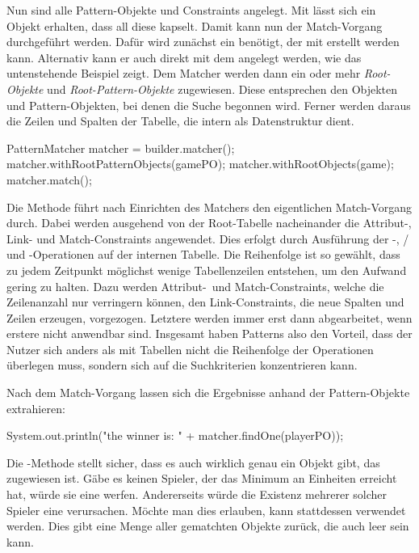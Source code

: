 Nun sind alle Pattern-Objekte und Constraints angelegt.
Mit  lässt sich ein Objekt erhalten, dass all diese kapselt.
Damit kann nun der Match-Vorgang durchgeführt werden.
Dafür wird zunächst ein  benötigt, der mit  erstellt werden kann.
Alternativ kann er auch direkt mit dem  angelegt werden, wie das untenstehende Beispiel zeigt.
Dem Matcher werden dann ein oder mehr \emph{Root-Objekte} und \emph{Root-Pattern-Objekte} zugewiesen.
Diese entsprechen den Objekten und Pattern-Objekten, bei denen die Suche begonnen wird.
Ferner werden daraus die Zeilen und Spalten der Tabelle, die intern als Datenstruktur dient.

\begin{jcodeblock}
    PatternMatcher matcher = builder.matcher();
    matcher.withRootPatternObjects(gamePO);
    matcher.withRootObjects(game);
    matcher.match();
\end{jcodeblock}

Die Methode  führt nach Einrichten des Matchers den eigentlichen Match-Vorgang durch.
Dabei werden ausgehend von der Root-Tabelle nacheinander die Attribut-, Link- und Match-Constraints angewendet.
Dies erfolgt durch Ausführung der -,  /  und -Operationen auf der internen Tabelle.
Die Reihenfolge ist so gewählt, dass zu jedem Zeitpunkt möglichst wenige Tabellenzeilen entstehen, um den Aufwand gering zu halten.
Dazu werden Attribut-\ und Match-Constraints, welche die Zeilenanzahl nur verringern können, den Link-Constraints, die neue Spalten und Zeilen erzeugen, vorgezogen.
Letztere werden immer erst dann abgearbeitet, wenn erstere nicht anwendbar sind.
Insgesamt haben Patterns also den Vorteil, dass der Nutzer sich anders als mit Tabellen nicht die Reihenfolge der Operationen überlegen muss, sondern sich auf die Suchkriterien konzentrieren kann.

Nach dem Match-Vorgang lassen sich die Ergebnisse anhand der Pattern-Objekte extrahieren:

\begin{jcodeblock}
    System.out.println("the winner is: " + matcher.findOne(playerPO));
\end{jcodeblock}

Die -Methode stellt sicher, dass es auch wirklich genau ein Objekt gibt, das  zugewiesen ist.
Gäbe es keinen Spieler, der das Minimum an Einheiten erreicht hat, würde sie eine  werfen.
Andererseits würde die Existenz mehrerer solcher Spieler eine  verursachen.
Möchte man dies erlauben, kann stattdessen  verwendet werden.
Dies gibt eine Menge aller gematchten Objekte zurück, die auch leer sein kann.


